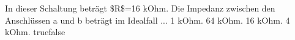     {In dieser Schaltung beträgt \$R\$=16 kOhm. Die Impedanz zwischen den Anschlüssen a und b beträgt im Idealfall ...}
    {1 kOhm.}
    {64 kOhm.}
    {16 kOhm.}
    {4 kOhm.}
    {true}{false}
